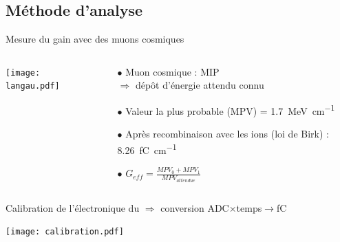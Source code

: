     \subsection{Méthode d'analyse}

    \begin{frame}{Mesure du gain avec des muons cosmiques}
    	\begin{scriptsize}
            \begin{columns}
                \begin{column}{0.6\textwidth}
                    \centering \texttt{[image: langau.pdf]}
                \end{column}\hfill
                \begin{column}{0.4\textwidth}
                    \begin{itemize}
       					\item[$\bullet$] Muon cosmique : MIP \\ $\Rightarrow$ dépôt d'énergie attendu connu
       					\item[$\bullet$] Valeur la plus probable (MPV) = \SI{1.7}{\mega\electronvolt\per\centi\meter}
       					\item[$\bullet$] Après recombinaison avec les ions (loi de Birk) : \SI{8.26}{\femto\coulomb\per\centi\meter}
       					\item[$\bullet$] $G_{eff}=\frac{MPV_0 + MPV_1}{MPV_{attendue}}$
       				\end{itemize}
                \end{column}
            \end{columns}
            \vspace{0.2cm}
            Calibration de l'électronique du \TOO{} $\Rightarrow$ conversion ADC$\times$temps$\to$\si{\femto\coulomb}
            \begin{center} \texttt{[image: calibration.pdf]} \end{center}
	    \end{scriptsize}
    \end{frame}

